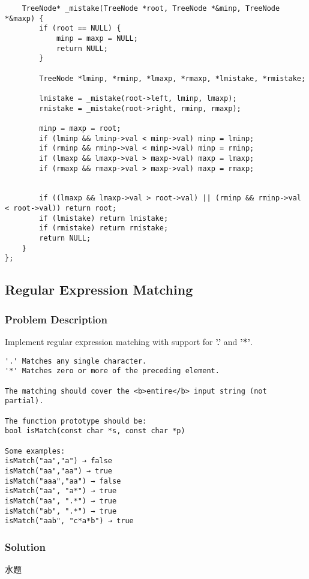 \documentclass[courier]{article}
\begin{document}
\begin{CJK*}{UTF8}{gkai}
\begin{lstlisting}
    TreeNode* _mistake(TreeNode *root, TreeNode *&minp, TreeNode *&maxp) {
        if (root == NULL) {
            minp = maxp = NULL;
            return NULL;
        }
    
        TreeNode *lminp, *rminp, *lmaxp, *rmaxp, *lmistake, *rmistake;
        
        lmistake = _mistake(root->left, lminp, lmaxp);
        rmistake = _mistake(root->right, rminp, rmaxp);
        
        minp = maxp = root;
        if (lminp && lminp->val < minp->val) minp = lminp;
        if (rminp && rminp->val < minp->val) minp = rminp;
        if (lmaxp && lmaxp->val > maxp->val) maxp = lmaxp;
        if (rmaxp && rmaxp->val > maxp->val) maxp = rmaxp;
        
        
        if ((lmaxp && lmaxp->val > root->val) || (rminp && rminp->val < root->val)) return root;
        if (lmistake) return lmistake;
        if (rmistake) return rmistake;
        return NULL;
    }
}; 
\end{lstlisting}


\subsection{ Regular Expression Matching }

\subsubsection*{Problem Description}
Implement regular expression matching with support for \textbf{'.'} and \textbf{'*'}.

\begin{verbatim}
'.' Matches any single character.
'*' Matches zero or more of the preceding element.

The matching should cover the <b>entire</b> input string (not partial).

The function prototype should be:
bool isMatch(const char *s, const char *p)

Some examples:
isMatch("aa","a") → false
isMatch("aa","aa") → true
isMatch("aaa","aa") → false
isMatch("aa", "a*") → true
isMatch("aa", ".*") → true
isMatch("ab", ".*") → true
isMatch("aab", "c*a*b") → true
\end{verbatim}


\subsubsection*{Solution}
水题


\end{CJK*}
\end{document}
